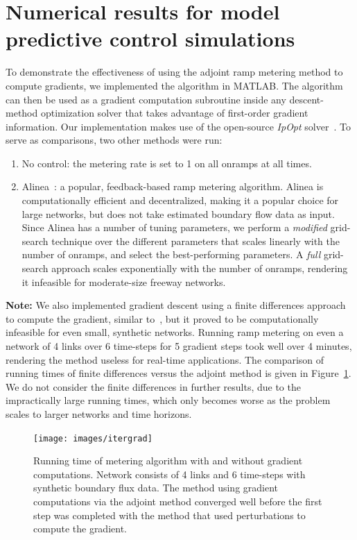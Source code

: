\section{Numerical results for model predictive control simulations\label{sec:Numerical-results-for}}

To demonstrate the effectiveness of using the adjoint ramp metering
method to compute gradients, we implemented the algorithm in MATLAB.
The algorithm can then be used as a gradient computation subroutine
inside any descent-method optimization solver that takes advantage
of first-order gradient information. Our implementation makes use
of the open-source \emph{IpOpt} solver~\cite{Andreas2005}. To serve
as comparisons, two other methods were run:
\begin{enumerate}
\item No control: the metering rate is set to 1 on all onramps at all times.
\item Alinea~\cite{Papageorgiou1991}: a popular, feedback-based ramp metering
algorithm. Alinea is computationally efficient and decentralized,
making it a popular choice for large networks, but does not take estimated
boundary flow data as input. Since Alinea has a number of tuning parameters,
we perform a \emph{modified} grid-search technique over the different
parameters that scales linearly with the number of onramps, and select
the best-performing parameters. A \emph{full} grid-search approach
scales exponentially with the number of onramps, rendering it infeasible
for moderate-size freeway networks.
\end{enumerate}
\textbf{Note: } We also implemented gradient descent using a finite differences approach to compute the gradient, similar to~\cite{Frejo2011,Ramon2013}, but it proved to be computationally infeasible for even small, synthetic
networks. Running ramp metering on even a network of 4 links over
6 time-steps for 5 gradient steps took well over 4 minutes,
rendering the method useless for real-time applications. The comparison
of running times of finite differences versus the adjoint method is given in
Figure~\ref{fig:Running-time-of}. We do not consider the finite differences in further results, due to the impractically large running times, which only becomes worse as the problem scales to larger networks and time horizons.
\begin{figure}
\begin{centering}
\texttt{[image: images/itergrad]}
\par\end{centering}

\caption{Running time of metering algorithm with and without gradient computations.
Network consists of 4 links and 6 time-steps with synthetic boundary
flux data. The method using gradient computations via the adjoint
method converged well before the first step was completed with the
method that used perturbations to compute the gradient.\label{fig:Running-time-of}}
\end{figure}



